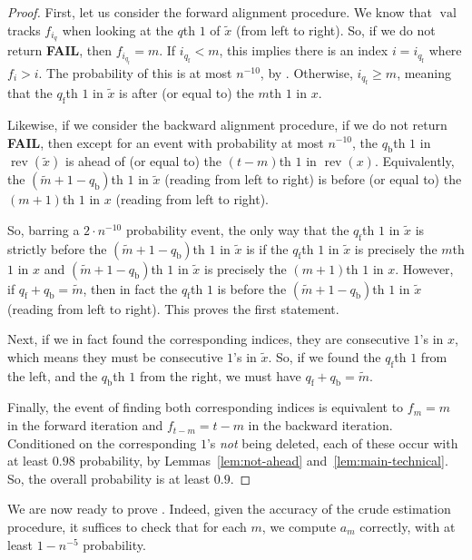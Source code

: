 \documentclass[12pt]{article}
\theoremstyle{definition}
\theoremstyle{remark}
\DeclareMathOperator{\val}{val}
\DeclareMathOperator{\rev}{rev}
\begin{document}
\begin{proof}
    First, let us consider the forward alignment procedure. We know that $\val$ tracks $f_{i_q}$ when looking at the $q$th $1$ of $\tilde{x}$ (from left to right). So, if we do not return \textbf{FAIL}, then $f_{i_{q_{\text{f}}}} = m$. If $i_{q_{\text{f}}} < m$, this implies there is an index $i = i_{q_{\text{f}}}$ where $f_i > i$. The probability of this is at most $n^{-10}$, by . Otherwise, $i_{q_{\text{f}}} \ge m$, meaning that the $q_{\text{f}}$th $1$ in $\tilde{x}$ is after (or equal to) the $m$th $1$ in $x$.

    Likewise, if we consider the backward alignment procedure, if we do not return \textbf{FAIL}, then except for an event with probability at most $n^{-10}$, the $q_{\text{b}}$th $1$ in $\rev(\tilde{x})$ is ahead of (or equal to) the $(t-m)$th $1$ in $\rev(x)$. Equivalently, the $(\tilde{m}+1-q_{\text{b}})$th $1$ in $\tilde{x}$ (reading from left to right) is before (or equal to) the $(m+1)$th $1$ in $x$ (reading from left to right).

    So, barring a $2 \cdot n^{-10}$ probability event, the only way that the $q_{\text{f}}$th $1$ in $\tilde{x}$ is strictly before the $(\tilde{m}+1-q_{\text{b}})$th $1$ in $\tilde{x}$ is if the $q_{\text{f}}$th $1$ in $\tilde{x}$ is precisely the $m$th $1$ in $x$ and $(\tilde{m}+1-q_{\text{b}})$th $1$ in $\tilde{x}$ is precisely the $(m+1)$th $1$ in $x$. However, if $q_{\text{f}}+q_{\text{b}} = \tilde{m}$, then in fact the $q_{\text{f}}$th $1$ is before the $(\tilde{m}+1-q_{\text{b}})$th $1$ in $\tilde{x}$ (reading from left to right). This proves the first statement.

    Next, if we in fact found the corresponding indices, they are consecutive $1$'s in $x$, which means they must be consecutive $1$'s in $\tilde{x}$. So, if we found the $q_{\text{f}}$th $1$ from the left, and the $q_{\text{b}}$th $1$ from the right, we must have $q_{\text{f}}+q_{\text{b}} = \tilde{m}$.

    Finally, the event of finding both corresponding indices is equivalent to $f_m = m$ in the forward iteration and $f_{t-m} = t-m$ in the backward iteration. Conditioned on the corresponding $1$'s \emph{not} being deleted, each of these occur with at least $0.98$ probability, by Lemmas~\ref{lem:not-ahead} and~\ref{lem:main-technical}. So, the overall probability is at least $0.9$.
\end{proof}

We are now ready to prove . Indeed, given the accuracy of the crude estimation procedure, it suffices to check that for each $m$, we compute $a_m$ correctly, with at least $1 - n^{-5}$ probability.
\end{document}
